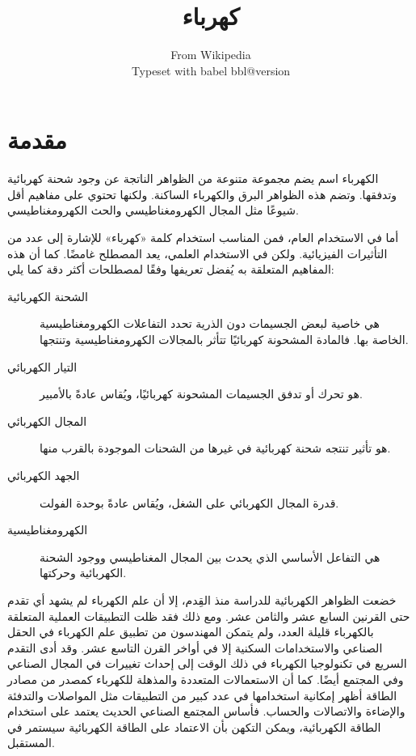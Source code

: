 \documentclass[a4paper]{book}
\title{كهرباء}
\author{From Wikipedia\\%
        Typeset with \textsf{babel}
        \addfontfeatures{Numbers=ArabicOff} \csname bbl@version\endcsname}
\begin{document}
\frontmatter

\maketitle

\tableofcontents

\chapter{مقدمة}

الكهرباء اسم يضم مجموعة متنوعة من الظواهر الناتجة عن وجود شحنة
كهربائية وتدفقها. وتضم هذه الظواهر البرق والكهرباء الساكنة. ولكنها
تحتوي على مفاهيم أقل شيوعًا مثل المجال الكهرومغناطيسي والحث
الكهرومغناطيسي.

أما في الاستخدام العام، فمن المناسب استخدام كلمة «كهرباء» للإشارة إلى
عدد من التأثيرات الفيزيائية. ولكن في الاستخدام العلمي، يعد المصطلح
غامضًا. كما أن هذه المفاهيم المتعلقة به يُفضل تعريفها وفقًا لمصطلحات أكثر
دقة كما يلي:

\begin{description}
\item[الشحنة الكهربائية] هي خاصية لبعض الجسيمات دون الذرية تحدد
التفاعلات الكهرومغناطيسية الخاصة بها. فالمادة المشحونة كهربائيًا تتأثر
بالمجالات الكهرومغناطيسية وتنتجها.
\item[التيار الكهربائي] هو تحرك أو تدفق الجسيمات المشحونة كهربائيًا،
ويُقاس عادةً بالأمبير.
\item[المجال الكهربائي] هو تأثير تنتجه شحنة كهربائية في غيرها من
الشحنات الموجودة بالقرب منها.
\item[الجهد الكهربائي] قدرة المجال الكهربائي على الشغل، ويُقاس عادةً
بوحدة الفولت.
\item[الكهرومغناطيسية] هي التفاعل الأساسي الذي يحدث بين المجال
المغناطيسي ووجود الشحنة الكهربائية وحركتها.
\end{description}

خضعت الظواهر الكهربائية للدراسة منذ القِدم، إلا أن علم الكهرباء لم يشهد
أي تقدم حتى القرنين السابع عشر والثامن عشر. ومع ذلك فقد ظلت التطبيقات
العملية المتعلقة بالكهرباء قليلة العدد، ولم يتمكن المهندسون من تطبيق
علم الكهرباء في الحقل الصناعي والاستخدامات السكنية إلا في أواخر القرن
التاسع عشر. وقد أدى التقدم السريع في تكنولوجيا الكهرباء في ذلك الوقت
إلى إحداث تغييرات في المجال الصناعي وفي المجتمع أيضًا. كما أن
الاستعمالات المتعددة والمذهلة للكهرباء كمصدر من مصادر الطاقة أظهر
إمكانية استخدامها في عدد كبير من التطبيقات مثل المواصلات والتدفئة
والإضاءة والاتصالات والحساب. فأساس المجتمع الصناعي الحديث يعتمد على
استخدام الطاقة الكهربائية، ويمكن التكهن بأن الاعتماد على الطاقة
الكهربائية سيستمر في المستقبل.
\end{document}
